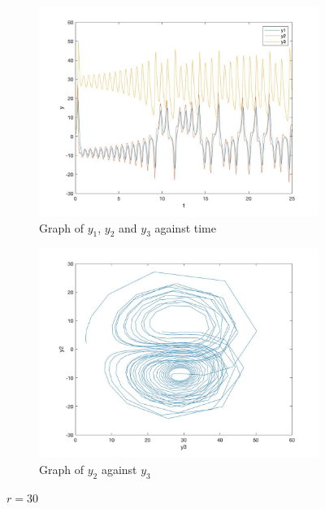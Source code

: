 \documentclass[a4paper,11pt]{article}
\begin{document}
\begin{figure}
     \centering
     \begin{subfigure}[b]{0.45\textwidth}
         \centering
         \includegraphics[width=\textwidth]{r30_y123_time}
         \caption{Graph of $y_{1}$, $y_{2}$ and $y_{3}$ against time}
         \label{fig:y equals x}
     \end{subfigure}
     \hfill
     \begin{subfigure}[b]{0.45\textwidth}
         \centering
         \includegraphics[width=\textwidth]{r30_y2_y3}
         \caption{Graph of $y_{2}$ against $y_{3}$}
         \label{fig:three sin x}
     \end{subfigure}
        \caption{$r=30$}
        \label{fig:r=30}
\end{figure}
\end{document}
